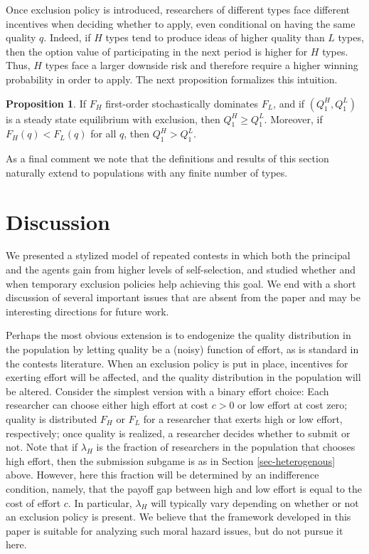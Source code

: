 \documentclass[12pt]{article}
\theoremstyle{plain}
\theoremstyle{definition}
\newtheorem{proposition}{Proposition}
\theoremstyle{remark}
\begin{document}
Once exclusion policy is introduced, researchers of different types face different incentives when deciding whether to apply, even conditional on having the same quality $q$. Indeed, if $H$ types tend to produce ideas of higher quality than $L$ types, then the option value of participating in the next period is higher for $H$ types. Thus, $H$ types face a larger downside risk and therefore require a higher winning probability in order to apply. The next proposition formalizes this intuition.

\begin{proposition}\label{prop-compare-types}
If $F_H$ first-order stochastically dominates $F_L$, and if $(Q_1^H,Q_1^L)$ is a steady state equilibrium with exclusion, then $Q_1^H \ge Q_1^L$. Moreover, if $F_H(q)<F_L(q)$ for all $q$, then $Q_1^H > Q_1^L$.
\end{proposition}

As a final comment we note that the definitions and results of this section naturally extend to populations with any finite number of types.


\section{Discussion}\label{sec-discussion}

We presented a stylized model of repeated contests in which both the principal and the agents gain from higher levels of self-selection, and studied whether and when temporary exclusion policies help achieving this goal. We end with a short discussion of several important issues that are absent from the paper and may be interesting directions for future work.

Perhaps the most obvious extension is to endogenize the quality distribution in the population by letting quality be a (noisy) function of effort, as is standard in the contests literature. When an exclusion policy is put in place, incentives for exerting effort will be affected, and the quality distribution in the population will be altered. Consider the simplest version with a binary effort choice: Each researcher can choose either high effort at cost $c>0$ or low effort at cost zero; quality is distributed $F_H$ or $F_L$ for a researcher that exerts high or low effort, respectively; once quality is realized, a researcher decides whether to submit or not. Note that if $\lambda_H$ is the fraction of researchers in the population that chooses high effort, then the submission subgame is as in Section \ref{sec-heterogenous} above. However, here this fraction will be determined by an indifference condition, namely, that the payoff gap between high and low effort is equal to the cost of effort $c$. In particular, $\lambda_H$ will typically vary depending on whether or not an exclusion policy is present. We believe that the framework developed in this paper is suitable for analyzing such moral hazard issues, but do not pursue it here. 
\end{document}
